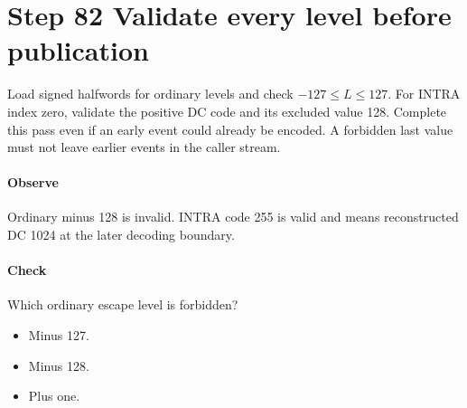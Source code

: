 \section{Step 82 Validate every level before publication}\label{h263-coeff-s02}
Load signed halfwords for ordinary levels and check $-127\leq L\leq127$.
For INTRA index zero, validate the positive DC code and its excluded value 128.
Complete this pass even if an early event could already be encoded. A forbidden
last value must not leave earlier events in the caller stream.

\paragraph{Observe} Ordinary minus 128 is invalid. INTRA code 255 is valid and
means reconstructed DC 1024 at the later decoding boundary.
\paragraph{Check} Which ordinary escape level is forbidden?
\begin{itemize}
  \item[A.] Minus 127.
  \item[B.] Minus 128.
  \item[C.] Plus one.
\end{itemize}
